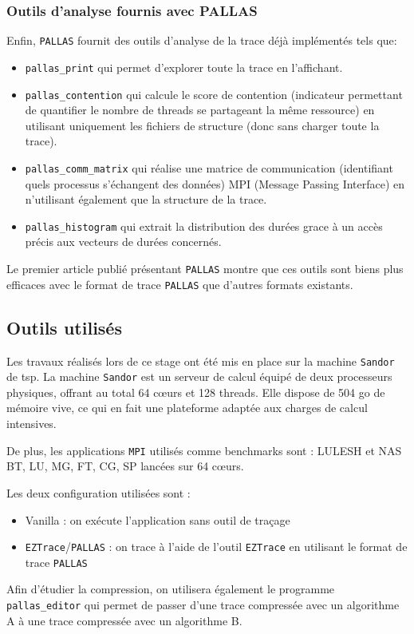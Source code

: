 \subsubsection{Outils d'analyse fournis avec PALLAS}\label{ssec:analysis_tools}

Enfin, \verb!PALLAS! fournit des outils d'analyse de la trace déjà implémentés tels que: 
\begin{itemize}
    \item \verb!pallas_print! qui permet d'explorer toute la trace en l'affichant.
    \item \verb!pallas_contention! qui calcule le score de contention (indicateur permettant de quantifier le nombre de threads se partageant la même ressource) en utilisant uniquement les fichiers de structure (donc sans charger toute la trace).
    \item \verb!pallas_comm_matrix! qui réalise une matrice de communication (identifiant quels processus s'échangent des données) MPI (Message Passing Interface) en n'utilisant également que la structure de la trace.
    \item \verb!pallas_histogram! qui extrait la distribution des durées grace à un accès précis aux vecteurs de durées concernés.
\end{itemize}

Le premier article \cite{pallas_ipdps} publié présentant \verb!PALLAS! montre que ces outils sont biens plus efficaces avec le format de trace \verb!PALLAS! que d'autres formats existants.

\subsection{Outils utilisés}\label{ssec:outils}

Les travaux réalisés lors de ce stage ont été mis en place sur la machine \verb!Sandor! de \gls{tsp}.
La machine \verb!Sandor! est un serveur de calcul équipé de deux processeurs physiques, 
offrant au total 64 c\oe{}urs et 128 threads.
Elle dispose de 504 \gls{go} de mémoire vive, ce qui en fait une plateforme adaptée aux charges de calcul intensives.\par
De plus, les applications \verb!MPI! utilisés comme benchmarks sont : LULESH et NAS BT, LU, MG, FT, CG, SP lancées sur 64 c\oe{}urs.

Les deux configuration utilisées sont : 
\begin{itemize}
    \item Vanilla : on exécute l'application sans outil de traçage
    \item \verb!EZTrace!/\verb!PALLAS! : on trace à l'aide de l'outil \verb!EZTrace! en utilisant le format de trace \verb!PALLAS!
\end{itemize}

Afin d'étudier la compression, on utilisera également le programme \verb!pallas_editor! qui permet de passer d'une trace compressée avec un algorithme A à une trace compressée avec
un algorithme B.
